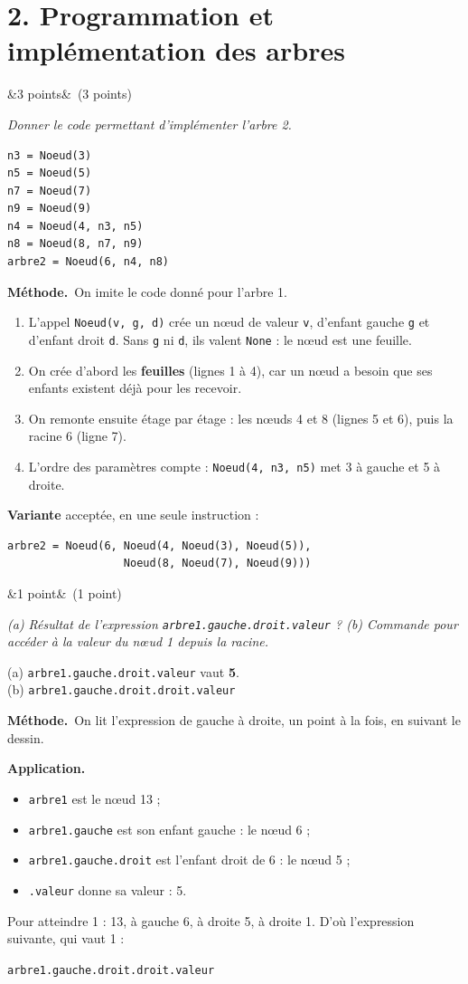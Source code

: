 \documentclass[11pt, a4paper]{exam}
\newcommand{\code}[1]{\texttt{#1}}
\newcommand{\Q}[3]{\par\needspace{5\baselineskip}\bigskip\noindent{\large\bfseries Question #1}\ifx&#2&\else\ \textnormal{(#2)}\fi\par\nopagebreak\smallskip\noindent\textit{#3}\par\nopagebreak\smallskip}
\newcommand{\methode}{\par\noindent\textbf{Méthode.}\ }
\newcommand{\application}{\par\noindent\textbf{Application.}\ }
\begin{document}
\section*{2. Programmation et implémentation des arbres}

\Q{4}{3 points}{Donner le code permettant d'implémenter l'arbre 2.}
\begin{reponse}
\begin{lstlisting}
n3 = Noeud(3)
n5 = Noeud(5)
n7 = Noeud(7)
n9 = Noeud(9)
n4 = Noeud(4, n3, n5)
n8 = Noeud(8, n7, n9)
arbre2 = Noeud(6, n4, n8)
\end{lstlisting}
\end{reponse}
\methode On imite le code donné pour l'arbre 1.
\begin{enumerate}
\item L'appel \code{Noeud(v, g, d)} crée un nœud de valeur \code{v}, d'enfant gauche \code{g} et d'enfant droit \code{d}. Sans \code{g} ni \code{d}, ils valent \code{None} : le nœud est une feuille.
\item On crée d'abord les \textbf{feuilles} (lignes 1 à 4), car un nœud a besoin que ses enfants existent déjà pour les recevoir.
\item On remonte ensuite étage par étage : les nœuds 4 et 8 (lignes 5 et 6), puis la racine 6 (ligne 7).
\item L'ordre des paramètres compte : \code{Noeud(4, n3, n5)} met 3 à gauche et 5 à droite.
\end{enumerate}
\textbf{Variante} acceptée, en une seule instruction :
\begin{lstlisting}
arbre2 = Noeud(6, Noeud(4, Noeud(3), Noeud(5)),
                  Noeud(8, Noeud(7), Noeud(9)))
\end{lstlisting}

\Q{5}{1 point}{(a) Résultat de l'expression \code{arbre1.gauche.droit.valeur} ? (b) Commande pour accéder à la valeur du nœud 1 depuis la racine.}
\begin{reponse}
(a) \code{arbre1.gauche.droit.valeur} vaut \textbf{5}. \\
(b) \code{arbre1.gauche.droit.droit.valeur}
\end{reponse}
\methode On lit l'expression de gauche à droite, un point à la fois, en suivant le dessin.
\application
\begin{itemize}
\item \code{arbre1} est le nœud 13 ;
\item \code{arbre1.gauche} est son enfant gauche : le nœud 6 ;
\item \code{arbre1.gauche.droit} est l'enfant droit de 6 : le nœud 5 ;
\item \code{.valeur} donne sa valeur : 5.
\end{itemize}
Pour atteindre 1 : 13, à gauche 6, à droite 5, à droite 1. D'où l'expression suivante, qui vaut 1 :
\begin{center}\code{arbre1.gauche.droit.droit.valeur}\end{center}
\end{document}
